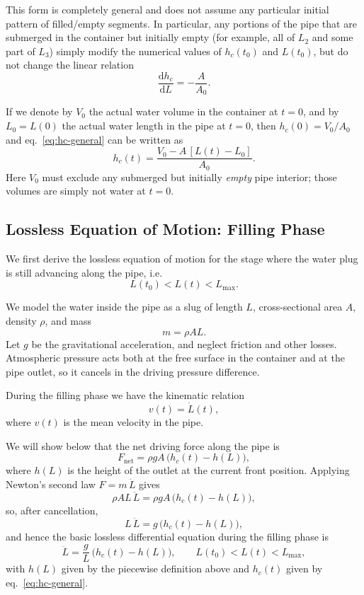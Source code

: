 \documentclass[11pt]{article}
\begin{document}
This form is completely general and does not assume any particular initial
pattern of filled/empty segments. In particular, any portions of the pipe that
are submerged in the container but initially empty (for example, all of $L_2$
and some part of $L_3$) simply modify the numerical values of $h_c(t_0)$ and
$L(t_0)$, but do not change the linear relation
\[
\frac{\mathrm{d}h_c}{\mathrm{d}L} = -\frac{A}{A_0}.
\]

If we denote by $V_0$ the actual water volume in the container at $t=0$, and by
$L_0 = L(0)$ the actual water length in the pipe at $t=0$, then
$h_c(0) = V_0/A_0$ and eq.~\eqref{eq:hc-general} can be written as
\begin{equation}
  h_c(t) = \frac{V_0 - A\,[L(t)-L_0]}{A_0}.
\end{equation}
Here $V_0$ must exclude any submerged but initially \emph{empty} pipe interior;
those volumes are simply not water at $t=0$.

\subsection{Lossless Equation of Motion: Filling Phase}

We first derive the lossless equation of motion for the stage where the water
plug is still advancing along the pipe, i.e.
\[
L(t_0) < L(t) < L_{\max}.
\]

We model the water inside the pipe as a slug of length $L$, cross-sectional area
$A$, density $\rho$, and mass
\[
m = \rho A L.
\]
Let $g$ be the gravitational acceleration, and neglect friction and other losses.
Atmospheric pressure acts both at the free surface in the container and at the
pipe outlet, so it cancels in the driving pressure difference.

During the filling phase we have the kinematic relation
\begin{equation}
  v(t) = \dot L(t),
\end{equation}
where $v(t)$ is the mean velocity in the pipe.

We will show below that the net driving force along the pipe is
\begin{equation}
  F_{\text{net}} = \rho g A \,\bigl(h_c(t) - h(L)\bigr),
\end{equation}
where $h(L)$ is the height of the outlet at the current front position.
Applying Newton's second law $F = m\,\ddot L$ gives
\[
\rho A L \,\ddot L
= \rho g A \,\bigl(h_c(t) - h(L)\bigr),
\]
so, after cancellation,
\[
L \,\ddot L = g \,\bigl(h_c(t) - h(L)\bigr),
\]
and hence the basic lossless differential equation during the filling phase is
\begin{equation}
\ddot L
  = \frac{g}{L}\,\bigl(h_c(t) - h(L)\bigr),
  \qquad L(t_0) < L(t) < L_{\max},
  \label{eq:lossless-filling}
\end{equation}
with $h(L)$ given by the piecewise definition above and $h_c(t)$ given by
eq.~\eqref{eq:hc-general}.
\end{document}
